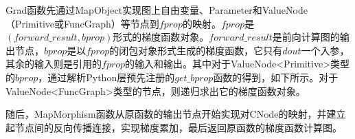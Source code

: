 \documentclass[letterpaper,10pt,english]{sphinxmanual}
\begin{document}
\begin{sphinxVerbatim}[commandchars=\\\{\}]
\end{sphinxVerbatim}

\sphinxAtStartPar
Grad函数先通过MapObject实现图上自由变量、Parameter和ValueNode（Primitive或FuncGraph）等节点到\(fprop\)的映射。\(fprop\)是\((forward\_result, bprop)\)形式的梯度函数对象。\(forward\_result\)是前向计算图的输出节点，\(bprop\)是以\(fprop\)的闭包对象形式生成的梯度函数，它只有\(dout\)一个入参，其余的输入则是引用的\(fprop\)的输入和输出。其中对于ValueNode<Primitive>类型的\(bprop\)，通过解析Python层预先注册的\(get\_bprop\)函数的得到，如下所示。对于ValueNode<FuncGraph>类型的节点，则递归求出它的梯度函数对象。

\begin{sphinxVerbatim}[commandchars=\\\{\}]
 
      

       
           
         

     
\end{sphinxVerbatim}

\sphinxAtStartPar
随后，MapMorphism函数从原函数的输出节点开始实现对CNode的映射，并建立起节点间的反向传播连接，实现梯度累加，最后返回原函数的梯度函数计算图。
\end{document}
